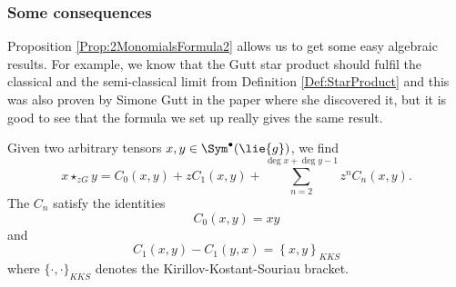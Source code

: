 \subsubsection*{Some consequences}
Proposition \ref{Prop:2MonomialsFormula2} allows us to get some easy 
algebraic results. For example, we know that the Gutt star product should 
fulfil the classical and the semi-classical limit from Definition 
\ref{Def:StarProduct} and this was also proven by Simone Gutt in the paper 
\cite{Gutt:83-Gst} where she discovered it, but it is good to see that the 
formula we set up really gives the same result.

\begin{corollary}
	\label{Cor:Formulas:LimitCases}
	Given two arbitrary tensors $x,y \in \Sym^{\bullet}(\lie{g})$, we find
	\begin{equation*}
		x \star_{zG} y
		=
		C_0(x, y) + z C_1(x, y) + 
		\sum\limits_{n = 2}^{\deg x + \deg y - 1} 
		z^n C_n(x,y).
	\end{equation*}
	The $C_n$ satisfy the identities
	\begin{equation*}
		C_0(x,y)
		= 
		xy
	\end{equation*}
	and 
	\begin{equation*}
		C_1(x,y) - C_1(y,x)
		= 
		\left\{ x, y \right\}_{KKS}
	\end{equation*}
	where $\{ \cdot, \cdot \}_{KKS}$ denotes the Kirillov-Kostant-Souriau 
	bracket.
\end{corollary}

